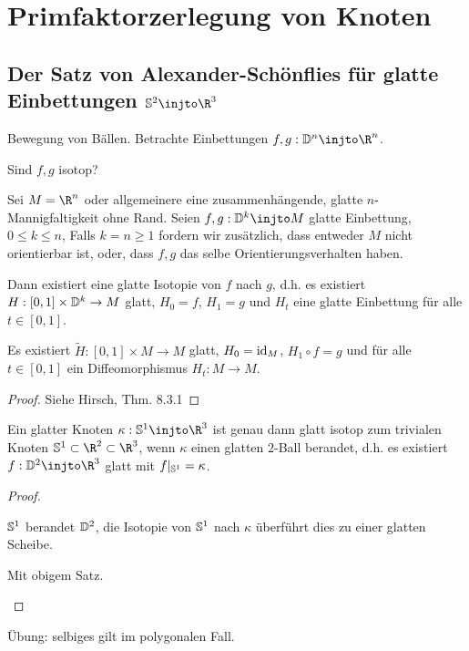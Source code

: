 \chapter{Primfaktorzerlegung von Knoten}


\section[Der Satz von Alexander-Schönflies]{Der Satz von Alexander-Schönflies für glatte Einbettungen \texorpdfstring{$\S^2 \injto \R^3$}{𝕊² ↪ ℝ³}}

Bewegung von Bällen.
Betrachte Einbettungen $f, g: \D^n \injto \R^n$.

Sind $f, g$ isotop?

\begin{st}
    Sei $M = \R^n$ oder allgemeinere eine zusammenhängende, glatte $n$-Mannigfaltigkeit ohne Rand.
    Seien $f,g : \D^k \injto M$ glatte Einbettung, $0 \le k \le n$,
    Falls $k = n \ge 1$ fordern wir zusätzlich, dass entweder $M$ nicht orientierbar ist, oder, dass $f, g$ das selbe Orientierungsverhalten haben.

    Dann existiert eine glatte Isotopie von $f$ nach $g$, d.h. es existiert $H: [0,1] \times \D^k \to M$ glatt, $H_0 = f$, $H_1 = g$ und $H_t$ eine glatte Einbettung für alle $t \in [0,1]$.
    \begin{note}
        Es existiert $\tilde H: [0,1] \times M \to M$ glatt, $H_0 = \id_M$, $H_1 \circ f = g$ und für alle $t \in [0,1]$ ein Diffeomorphismus $H_t: M \to M$.
    \end{note}
    \begin{proof}
        Siehe Hirsch, Thm. 8.3.1
    \end{proof}
\end{st}

\begin{ex}
    Ein glatter Knoten $\kappa: \S^1 \injto \R^3$ ist genau dann glatt isotop zum trivialen Knoten $\S^1 \subset \R^2 \subset \R^3$, wenn $\kappa$ einen glatten $2$-Ball berandet, d.h. es existiert $f: \D^2 \injto \R^3$ glatt mit $f|_{\S^1} = \kappa$.
    \begin{proof}
        \begin{seg}{\ProofImplication}
            $\S^1$ berandet $\D^2$, die Isotopie von $\S^1$ nach $\kappa$ überführt dies zu einer glatten Scheibe.
        \end{seg}
        \begin{seg}{\ProofImplication*}
            Mit obigem Satz.
        \end{seg}
    \end{proof}
    \begin{note}
        Übung: selbiges gilt im polygonalen Fall.
    \end{note}
\end{ex}

